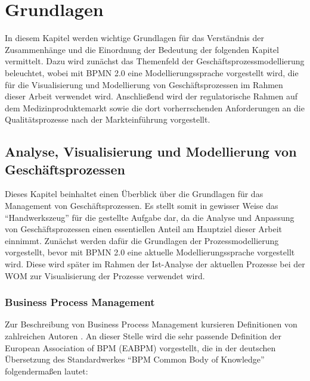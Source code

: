 \documentclass[a4paper,12pt]{report}
\begin{document}
\chapter{Grundlagen}\label{chap:Grundlagen}
In diesem Kapitel werden wichtige Grundlagen für das Verständnis der Zusammenhänge und die Einordnung der Bedeutung der folgenden Kapitel vermittelt. Dazu wird zunächst das Themenfeld der Geschäftsprozessmodellierung beleuchtet, wobei mit BPMN 2.0 eine Modellierungssprache vorgestellt wird, die für die Visualisierung und Modellierung von Geschäftsprozessen im Rahmen dieser Arbeit verwendet wird. Anschließend wird der regulatorische Rahmen auf dem Medizinproduktemarkt sowie die dort vorherrschenden Anforderungen an die Qualitätsprozesse nach der Markteinführung vorgestellt.

\section{Analyse, Visualisierung und Modellierung von Geschäftsprozessen}\label{sec:BPM}
Dieses Kapitel beinhaltet einen Überblick über die Grundlagen für das Management von Geschäftsprozessen. Es stellt somit in gewisser Weise das "`Handwerkszeug"' für die gestellte Aufgabe dar, da die Analyse und Anpassung von Geschäftsprozessen einen essentiellen Anteil am Hauptziel dieser Arbeit einnimmt. Zunächst werden dafür die Grundlagen der Prozessmodellierung vorgestellt, bevor mit BPMN 2.0 eine aktuelle Modellierungssprache vorgestellt wird. Diese wird später im Rahmen der Ist-Analyse der aktuellen Prozesse bei der \ac{WOM} zur Visualisierung der Prozesse verwendet wird.
\subsection{Business Process Management}\label{subsec:BPManagement}
Zur Beschreibung von Business Process Management kursieren Definitionen von zahlreichen Autoren \citep[vgl.][S. 1]{Freund2014}. An dieser Stelle wird die sehr passende Definition der European Association of BPM (EABPM) vorgestellt, die in der deutschen Übersetzung des Standardwerkes "`BPM Common Body of Knowledge"' \cite[S. 38ff.]{Eabpm2009} folgendermaßen lautet:
\end{document}
